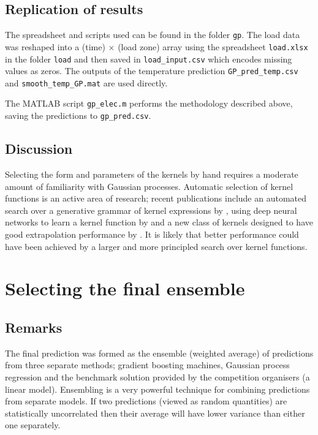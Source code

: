 \documentclass[preprint,authoryear,12pt]{elsarticle}
\begin{document}
\subsection{Replication of results}

The spreadsheet and scripts used can be found in the folder \texttt{gp}.
The load data was reshaped into a (time) $\times$ (load zone) array using the spreadsheet \texttt{load.xlsx} in the folder \texttt{load} and then saved in \texttt{load\_input.csv} which encodes missing values as zeros.
The outputs of the temperature prediction \texttt{GP\_pred\_temp.csv} and \texttt{smooth\_temp\_GP.mat} are used directly.

The MATLAB script \texttt{gp\_elec.m} performs the methodology described above, saving the predictions to \texttt{gp\_pred.csv}.

\subsection{Discussion}

Selecting the form and parameters of the kernels by hand requires a moderate amount of familiarity with Gaussian processes.
Automatic selection of kernel functions is an active area of research; recent publications include an automated search over a generative grammar of kernel expressions by \cite{duvenaud2013structure}, using deep neural networks to learn a kernel function by \cite{salakhutdinov2008using} and a new class of kernels designed to have good extrapolation performance by \cite{wilson2013gaussian}.
It is likely that better performance could have been achieved by a larger and more principled search over kernel functions.

\section{Selecting the final ensemble}

\label{sec:ensemble}

\subsection{Remarks}

The final prediction was formed as the ensemble (weighted average) of predictions from three separate methods; gradient boosting machines, Gaussian process regression and the benchmark solution provided by the competition organisers (a linear model).
Ensembling is a very powerful technique for combining predictions from separate models.
If two predictions (viewed as random quantities) are statistically uncorrelated then their average will have lower variance than either one separately.
\end{document}
